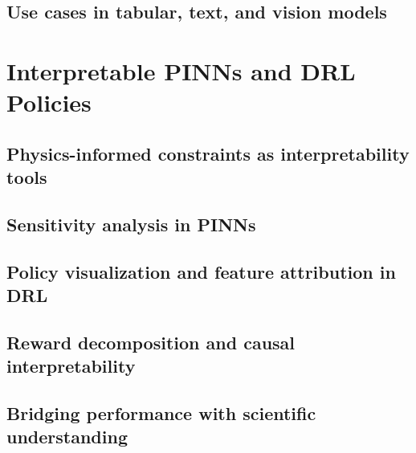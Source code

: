 \subsection{Use cases in tabular, text, and vision models}

\section{Interpretable PINNs and DRL Policies}
\subsection{Physics-informed constraints as interpretability tools}
\subsection{Sensitivity analysis in PINNs}
\subsection{Policy visualization and feature attribution in DRL}
\subsection{Reward decomposition and causal interpretability}
\subsection{Bridging performance with scientific understanding}


